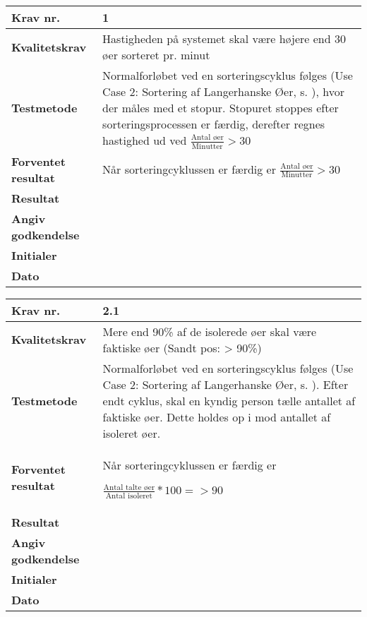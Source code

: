 
 	\begin{center}
		\begin{longtable}{ | m{4cm}| m{8.5cm}|} 
			\hline
			\textbf{Krav nr.} & 1 \\ 
			\hline
			\textbf{Kvalitetskrav} & Hastigheden på systemet skal være højere end 30 øer sorteret pr. minut \\
			\hline
			\textbf{Testmetode} & Normalforløbet ved en sorteringscyklus følges (Use Case 2: Sortering af Langerhanske Øer, s. \pageref{uc:2}), hvor der måles med et stopur. Stopuret stoppes efter sorteringsprocessen er færdig, derefter regnes hastighed ud ved 
$\frac{\text{Antal øer}}{\text{Minutter}}>30$ \\
			\hline
			\textbf{Forventet resultat}  & Når sorteringcyklussen er færdig er
			$\frac{\text{Antal øer}}{\text{Minutter}}>30$  \\
			\hline
			\textbf{Resultat}  &    \\
			\hline
			\textbf{Angiv godkendelse} &     \\
			\hline
			\textbf{Initialer} &     \\
			\hline
			\textbf{Dato} &    \\
			\hline
		\end{longtable}
	\end{center}
			
 	\begin{center}
		\begin{longtable}{ | m{4cm}| m{8.5cm}|} 
			\hline
			\textbf{Krav nr.} & 2.1 \\ 
			\hline
			\textbf{Kvalitetskrav} & Mere end 90\% af de isolerede øer skal være faktiske øer 
(Sandt pos: > 90\%) \\
			\hline
			\textbf{Testmetode} & Normalforløbet ved en sorteringscyklus følges (Use Case 2: Sortering af Langerhanske Øer, s. \pageref{uc:2}). Efter endt cyklus, skal en kyndig person tælle antallet af faktiske øer. Dette holdes op i mod antallet af isoleret øer.  \\
			\hline
			\textbf{Forventet resultat}  & Når sorteringcyklussen er færdig er

 $\frac{\text{Antal talte øer}}{\text{Antal isoleret}}*100=>90$  \\
			\hline
			\textbf{Resultat}  &    \\
			\hline
			\textbf{Angiv godkendelse} &     \\
			\hline
			\textbf{Initialer} &     \\
			\hline
			\textbf{Dato} &    \\
			\hline
		\end{longtable}
	\end{center}		

